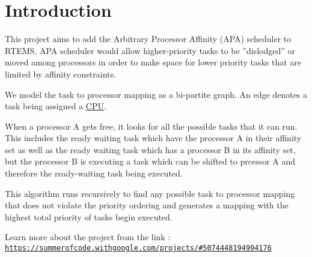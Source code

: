 \hypertarget{index_Introduction}{}\section{Introduction}\label{index_Introduction}
This project aims to add the Arbitrary Processor Affinity (A\+PA) scheduler to R\+T\+E\+MS. A\+PA scheduler would allow higher-\/priority tasks to be ”dislodged” or moved among processors in order to make space for lower priority tasks that are limited by affinity constraints.

We model the task to processor mapping as a bi-\/partite graph. An edge denotes a task being assigned a \hyperlink{structCPU}{C\+PU}.

When a processor A gets free, it looks for all the possible tasks that it can run. This includes the ready waiting task which have the processor A in their affinity set as well as the ready waiting task which has a processor B in its affinity set, but the processor B is executing a task which can be shifted to prcessor A and therefore the ready-\/waiting task being executed.

This algorithm runs recursively to find any possible task to processor mapping that does not violate the priority ordering and generates a mapping with the highest total priority of tasks begin executed.

Learn more about the project from the link \+: \href{https://summerofcode.withgoogle.com/projects/#5074448194994176}{\tt https\+://summerofcode.\+withgoogle.\+com/projects/\#5074448194994176} 